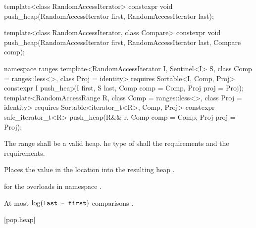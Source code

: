 %
\begin{itemdecl}
template<class RandomAccessIterator>
  constexpr void push_heap(RandomAccessIterator first, RandomAccessIterator last);

template<class RandomAccessIterator, class Compare>
  constexpr void push_heap(RandomAccessIterator first, RandomAccessIterator last,
                           Compare comp);
\end{itemdecl}
\begin{addedblock}
\begin{itemdecl}
namespace ranges {
  template<RandomAccessIterator I, Sentinel<I> S, class Comp = ranges::less<>,
      class Proj = identity>
    requires Sortable<I, Comp, Proj>
    constexpr I
      push_heap(I first, S last, Comp comp = Comp{}, Proj proj = Proj{});
  template<RandomAccessRange R, class Comp = ranges::less<>, class Proj = identity>
    requires Sortable<iterator_t<R>, Comp, Proj>
    constexpr safe_iterator_t<R>
      push_heap(R&& r, Comp comp = Comp{}, Proj proj = Proj{});
}
\end{itemdecl}
\end{addedblock}

\begin{itemdescr}
\pnum
\requires
The range
shall be a valid heap.
he type of
 shall 
the  requirements
and the  requirements.

\pnum
\effects
Places the value in the location
into the resulting heap
.

\begin{addedblock}
\pnum
\returns
{} for the overloads in namespace .
\end{addedblock}

\pnum
\complexity
At most
$\log(\texttt{last - first})$
comparisons .
\end{itemdescr}


[pop.heap]{}

